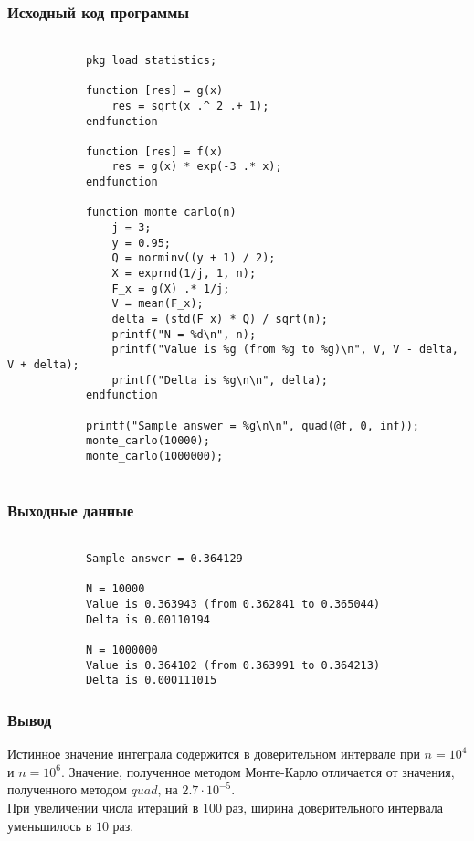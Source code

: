 \documentclass{article}
\begin{document}
        \subsubsection{Исходный код программы}
        \begin{minipage}{\linewidth}
            \begin{verbatim}
            
            pkg load statistics;

            function [res] = g(x)
                res = sqrt(x .^ 2 .+ 1);
            endfunction

            function [res] = f(x)
                res = g(x) * exp(-3 .* x);
            endfunction

            function monte_carlo(n)
                j = 3;
                y = 0.95;
                Q = norminv((y + 1) / 2);
                X = exprnd(1/j, 1, n);
                F_x = g(X) .* 1/j;
                V = mean(F_x);
                delta = (std(F_x) * Q) / sqrt(n);
                printf("N = %d\n", n);
                printf("Value is %g (from %g to %g)\n", V, V - delta, V + delta);
                printf("Delta is %g\n\n", delta);
            endfunction

            printf("Sample answer = %g\n\n", quad(@f, 0, inf));
            monte_carlo(10000);
            monte_carlo(1000000);
            
            \end{verbatim}
        \end{minipage}
        \subsubsection{Выходные данные}
         \begin{minipage}{\linewidth}
            \begin{verbatim}

            Sample answer = 0.364129

            N = 10000
            Value is 0.363943 (from 0.362841 to 0.365044)
            Delta is 0.00110194

            N = 1000000
            Value is 0.364102 (from 0.363991 to 0.364213)
            Delta is 0.000111015

            \end{verbatim}
        \end{minipage}
        \subsubsection{Вывод}
        Истинное значение интеграла содержится в доверительном интервале при $n = 10^4$ и $n = 10^6$. Значение, полученное методом Монте-Карло отличается от значения, полученного методом $quad$, на $2.7 \cdot 10^{-5}$.\\
        При увеличении числа итераций в $100$ раз, ширина доверительного интервала уменьшилось в $10$ раз.
\end{document}

